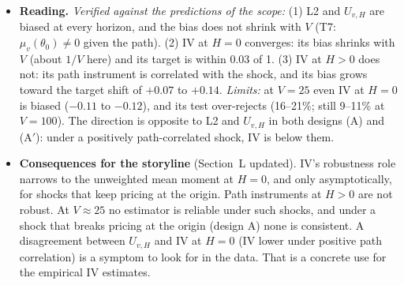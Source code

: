 \documentclass[11pt]{article}
\begin{document}
\begin{itemize}
\item \textbf{Reading.} \emph{Verified against the predictions of the scope:} (1) L2 and $U_{v,H}$ are biased at every horizon, and the bias does not shrink with $V$ (T7: $\mu_v(\theta_0)\neq0$ given the path). (2) IV at $H=0$ converges: its bias shrinks with $V$ (about $1/V$ here) and its target is within 0.03 of 1. (3) IV at $H>0$ does not: its path instrument is correlated with the shock, and its bias grows toward the target shift of $+0.07$ to $+0.14$. \emph{Limits:} at $V=25$ even IV at $H=0$ is biased ($-0.11$ to $-0.12$), and its test over-rejects (16--21\%; still 9--11\% at $V=100$). The direction is opposite to L2 and $U_{v,H}$ in both designs (A) and (A$'$): under a positively path-correlated shock, IV is below them.
\item \textbf{Consequences for the storyline} (Section~L updated). IV's robustness role narrows to the unweighted mean moment at $H=0$, and only asymptotically, for shocks that keep pricing at the origin. Path instruments at $H>0$ are not robust. At $V\approx25$ no estimator is reliable under such shocks, and under a shock that breaks pricing at the origin (design A) none is consistent. A disagreement between $U_{v,H}$ and IV at $H=0$ (IV lower under positive path correlation) is a symptom to look for in the data. That is a concrete use for the empirical IV estimates.
\end{itemize}
\end{document}
